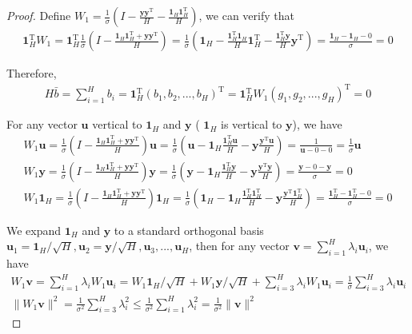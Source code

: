 \documentclass{article}
\newcommand*{\vect}[1]{\textbf{#1}}
\begin{document}
\begin{proof}
Define $W_1=\frac{1}{\sigma}(I-\frac{\vect{y}\vect{y}^\text{T}}{H}-\frac{\vect{1}_H\vect{1}_H^\text{T}}{H})$, we can verify that
\begin{equation}\begin{aligned}
\vect{1}_H^\text{T}W_1=\vect{1}_H^\text{T}\frac{1}{\sigma}(I-\frac{\vect{1}_H\vect{1}_H^\text{T}+\vect{y}\vect{y}^\text{T}}{H})=\frac{1}{\sigma}(\vect{1}_H-\frac{\vect{1}_H^\text{T}\vect{1}_H}{H}\vect{1}_H^\text{T}-\frac{\vect{1}_H^\text{T}\vect{y}}{H}\vect{y}^\text{T})=\frac{\vect{1}_H-\vect{1}_H-0}{\sigma}=0
\end{aligned}\end{equation}

Therefore, 
\begin{equation}\begin{aligned}
H\bar b=\sum\limits_{i=1}^{H}b_i=\vect{1}_H^\text{T}(b_1, b_2,..., b_H)^\text{T}=\vect{1}_H^\text{T}W_1(g_1, g_2,..., g_H)^\text{T}=0
\end{aligned}\end{equation}

For any vector $\vect{u}$ vertical to $\vect{1}_H$ and $\vect{y}$ ( $\vect{1}_H$ is vertical to $\vect{y}$), we have
\begin{equation}\begin{aligned}
W_1\vect{u}=\frac{1}{\sigma}(I-\frac{\vect{1}_H\vect{1}_H^\text{T}+\vect{y}\vect{y}^\text{T}}{H})\vect{u}=\frac{1}{\sigma}(\vect{u}-\vect{1}_H\frac{\vect{1}_H^\text{T}\vect{u}}{H}-\vect{y}\frac{\vect{y}^\text{T}\vect{u}}{H})=\frac{1}{\vect{u}-0-0}=\frac{1}{\sigma}\vect{u}\\
W_1\vect{y}=\frac{1}{\sigma}(I-\frac{\vect{1}_H\vect{1}_H^\text{T}+\vect{y}\vect{y}^\text{T}}{H})\vect{y}=\frac{1}{\sigma}(\vect{y}-\vect{1}_H\frac{\vect{1}_H^\text{T}\vect{y}}{H}-\vect{y}\frac{\vect{y}^\text{T}\vect{y}}{H})=\frac{\vect{y}-0-\vect{y}}{\sigma}=0\\
W_1\vect{1}_H=\frac{1}{\sigma}(I-\frac{\vect{1}_H\vect{1}_H^\text{T}+\vect{y}\vect{y}^\text{T}}{H})\vect{1}_H=\frac{1}{\sigma}(\vect{1}_H-\vect{1}_H\frac{\vect{1}_H^\text{T}\vect{1}_H^\text{T}}{H}-\vect{y}\frac{\vect{y}^\text{T}\vect{1}_H^\text{T}}{H})=\frac{\vect{1}_H^\text{T}-\vect{1}_H^\text{T}-0}{\sigma}=0
\end{aligned}\end{equation}

We expand $\vect{1}_H$ and $\vect{y}$ to a standard orthogonal basis $\vect{u}_1=\vect{1}_H/\sqrt{H}, \vect{u}_2=\vect{y}/\sqrt{H}, \vect{u}_3, ..., \vect{u}_{H}$, then for any vector $\vect{v}=\sum\limits_{i=1}^H\lambda_i\vect{u}_i$, we have
\begin{equation}\begin{aligned}
W_1\vect{v}=\sum\limits_{i=1}^H\lambda_iW_1\vect{u}_i=W_1\vect{1}_H/\sqrt{H}+W_1\vect{y}/\sqrt{H}+\sum\limits_{i=3}^H\lambda_iW_1\vect{u}_i=\frac{1}{\sigma}\sum\limits_{i=3}^H\lambda_i\vect{u}_i\\
\|W_1\vect{v}\|^2=\frac{1}{\sigma^2}\sum\limits_{i=3}^H\lambda_i^2\le\frac{1}{\sigma^2}\sum\limits_{i=1}^H\lambda_i^2=\frac{1}{\sigma^2}\|\vect{v}\|^2 \label{W_1v}
\end{aligned}\end{equation}


\end{proof}
\end{document}
